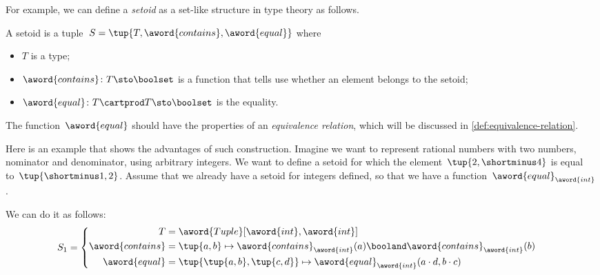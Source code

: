 For example, we can define a \emph{setoid} as a set-like structure in type theory as follows.

\begin{ctdefinition}[Setoid]\label{def:setoid}
    A setoid is a tuple~$S = \tup{T, \aword{contains}, \aword{equal}}$ where
    \begin{itemize}
        \item $T$ is a type;
        \item $\aword{contains}\colon T\sto\boolset$ is a function that tells use whether an element belongs to the setoid;
        \item $\aword{equal}\colon T\cartprod T\sto\boolset$ is the equality.
    \end{itemize}
\end{ctdefinition}
The function~$\aword{equal}$ should have the properties of an \emph{equivalence relation},
which will be discussed in \cref{def:equivalence-relation}.

Here is an example that shows the advantages of such construction.
Imagine we want to represent rational numbers with two numbers, nominator and denominator, using arbitrary integers.
We want to define a setoid for which the element~$\tup{2, \shortminus 4}$ is equal to~$\tup{ \shortminus  1, 2}$.
Assume that we already have a setoid for integers defined, so that we have a function~$\aword{equal}_{\aword{int}}$.

We can do it as follows:
\begin{equation}
    S_1 =
    \begin{cases}
        \begin{aligned}
            T                & =
            \aword{Tuple}[\aword{int}, \aword{int}]
            \\
            \aword{contains} & = \tup{a,b} \mapsto \aword{contains}_{\aword{int}}(a)  \booland \aword{contains}_{\aword{int}}(b)
            \\
            \aword{equal}    & = \tup{\tup{a,b}, \tup{c,d}}
            \mapsto \aword{equal}_{\aword{int}} (a\cdot d, b\cdot c)
        \end{aligned}
    \end{cases}
\end{equation}

